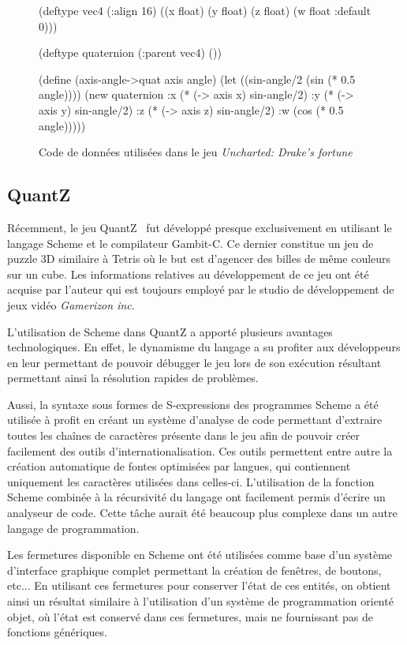 \documentclass[12pt,oneside,letterpaper,francais]{book}
\newcommand{\scheme}[1]{\selectlanguage{english}{\tt #1}\selectlanguage{french}}
\begin{document}
\begin{figure}[htb!]
  \begin{schemecode}
(deftype vec4 (:align 16)
  ((x float) (y float)
   (z float) (w float :default 0)))

(deftype quaternion (:parent vec4) ())

(define (axis-angle->quat axis angle)
 (let ((sin-angle/2 (sin (* 0.5 angle))))
  (new quaternion
       :x (* (-> axis x) sin-angle/2)
       :y (* (-> axis y) sin-angle/2)
       :z (* (-> axis z) sin-angle/2)
       :w (cos (* 0.5 angle)))))
  \end{schemecode}
  \caption{Code de données utilisées dans le jeu \textit{Uncharted:
      Drake's fortune}~\cite{ND_DRAKE}}
  \label{Rev:Drake}
\end{figure}


\subsection{QuantZ}
Récemment, le jeu QuantZ~\cite{Quantz} fut développé presque
exclusivement en utilisant le langage Scheme et le compilateur
Gambit-C. Ce dernier constitue un jeu de puzzle 3D similaire à Tetris
où le but est d'agencer des billes de même couleurs sur un cube. Les
informations relatives au développement de ce jeu ont été acquise par
l'auteur qui est toujours employé par le studio de développement de
jeux vidéo \textit{Gamerizon inc}.

L'utilisation de Scheme dans QuantZ a apporté plusieurs avantages
technologiques. En effet, le dynamisme du langage a su profiter aux
développeurs en leur permettant de pouvoir débugger le jeu lors de son
exécution résultant permettant ainsi la résolution rapides de
problèmes.

Aussi, la syntaxe sous formes de S-expressions des programmes Scheme a
été utilisée à profit en créant un système d'analyse de code
permettant d'extraire toutes les chaînes de caractères présente dans
le jeu afin de pouvoir créer facilement des outils
d'internationalisation. Ces outils permettent entre autre la création
automatique de fontes optimisées par langues, qui contiennent
uniquement les caractères utilisées dans celles-ci. L'utilisation de
la fonction Scheme \scheme{read} combinée à la récursivité du langage
ont facilement permis d'écrire un analyseur de code. Cette tâche
aurait été beaucoup plus complexe dans un autre langage de
programmation.

Les fermetures disponible en Scheme ont été utilisées comme base d'un
système d'interface graphique complet permettant la création de
fenêtres, de boutons, etc... En utilisant ces fermetures pour
conserver l'état de ces entités, on obtient ainsi un résultat
similaire à l'utilisation d'un système de programmation orienté objet,
où l'état est conservé dans ces fermetures, mais ne fournissant pas de
fonctions génériques.
\end{document}
